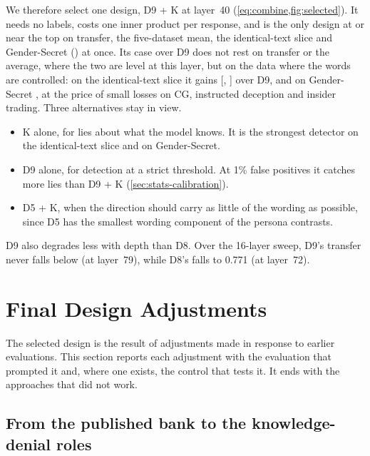 We therefore select one design, D9 + K at layer~40 (\cref{eq:combine,fig:selected}). It needs no
labels, costs one inner product per response, and is the only design at or near the top on transfer,
the five-dataset mean, the identical-text slice and Gender-Secret () at
once. Its case over D9 does not rest on transfer or the average, where the two are level at this
layer, but on the data where the words are
controlled: on the identical-text slice it gains 
[, ] over D9, and on
Gender-Secret , at the price of small losses on CG, instructed deception and insider
trading. Three alternatives stay in view.
\begin{itemize}[leftmargin=1.6em, itemsep=2pt]
\item K alone, for lies about what the model knows. It is the strongest detector on the identical-text
  slice and on Gender-Secret.
\item D9 alone, for detection at a strict threshold. At 1\% false positives it catches more lies than
  D9 + K (\cref{sec:stats-calibration}).
\item D5 + K, when the direction should carry as little of the wording as possible, since D5 has the
  smallest wording component of the persona contrasts.
\end{itemize}

D9 also degrades less with depth than D8. Over the 16-layer sweep, D9's transfer never falls below
 (at layer~79), while D8's falls to 0.771 (at layer~72).

\FloatBarrier
\section{Final Design Adjustments}
\label{sec:adjustments}

The selected design is the result of adjustments made in response to earlier evaluations. This
section reports each adjustment with the evaluation that prompted it and, where one exists, the
control that tests it. It ends with the approaches that did not work.

\subsection{From the published bank to the knowledge-denial roles}
\label{sec:adj-bank}


